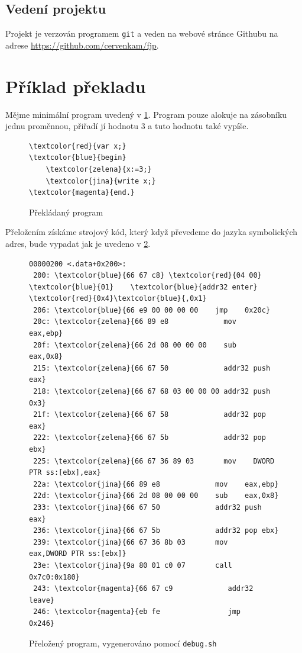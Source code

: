 \documentclass[a4paper]{article}
\begin{document}
\subsection{Veden\'i projektu}
Projekt je verzov\'an programem \texttt{git} a veden na webov\'e str\'ance
Githubu na adrese \url{https://github.com/cervenkam/fjp}. 
\clearpage
\section{P\v{r}\'iklad p\v{r}ekladu}
M\v{e}jme minim\'aln\'i program uveden\'y v \ref{program}.
Program pouze alokuje na z\'asobn\'iku jednu prom\v{e}nnou, p\v{r}i\v{r}ad\'i
j\'i hodnotu 3 a tuto hodnotu tak\'e vyp\'i\v{s}e.

\begin{figure}[!ht]
\centering
\begin{Verbatim}[commandchars=\\\{\}]
\textcolor{red}{var x;}
\textcolor{blue}{begin}
	\textcolor{zelena}{x:=3;}
	\textcolor{jina}{write x;}
\textcolor{magenta}{end.}
\end{Verbatim}
\caption{P\v{r}ekl\'adan\'y program}
\label{program}
\end{figure}

P\v{r}elo\v{z}en\'im
z\'isk\'ame strojov\'y k\'od, kter\'y kdy\v{z} p\v{r}evedeme do jazyka
symbolick\'ych adres, bude vypadat jak je uvedeno v \ref{objdump}.

\begin{figure}[!ht]
\centering
\begin{Verbatim}[commandchars=\\\{\}]
00000200 <.data+0x200>:
 200: \textcolor{blue}{66 67 c8} \textcolor{red}{04 00} \textcolor{blue}{01}    \textcolor{blue}{addr32 enter} \textcolor{red}{0x4}\textcolor{blue}{,0x1}
 206: \textcolor{blue}{66 e9 00 00 00 00    jmp    0x20c}
 20c: \textcolor{zelena}{66 89 e8             mov    eax,ebp}
 20f: \textcolor{zelena}{66 2d 08 00 00 00    sub    eax,0x8}
 215: \textcolor{zelena}{66 67 50             addr32 push eax}
 218: \textcolor{zelena}{66 67 68 03 00 00 00 addr32 push 0x3}
 21f: \textcolor{zelena}{66 67 58             addr32 pop eax}
 222: \textcolor{zelena}{66 67 5b             addr32 pop ebx}
 225: \textcolor{zelena}{66 67 36 89 03       mov    DWORD PTR ss:[ebx],eax}
 22a: \textcolor{jina}{66 89 e8             mov    eax,ebp}
 22d: \textcolor{jina}{66 2d 08 00 00 00    sub    eax,0x8}
 233: \textcolor{jina}{66 67 50             addr32 push eax}
 236: \textcolor{jina}{66 67 5b             addr32 pop ebx}
 239: \textcolor{jina}{66 67 36 8b 03       mov    eax,DWORD PTR ss:[ebx]}
 23e: \textcolor{jina}{9a 80 01 c0 07       call   0x7c0:0x180}
 243: \textcolor{magenta}{66 67 c9             addr32 leave}
 246: \textcolor{magenta}{eb fe                jmp    0x246}
\end{Verbatim}
\caption{P\v{r}elo\v{z}en\'y program, vygenerov\'ano pomoc\'i \texttt{debug.sh}}
\label{objdump}
\end{figure}
\end{document}
